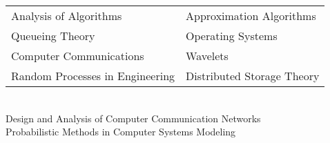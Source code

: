 \documentclass[margin,line]{resume}
\begin{document}
\begin{resume}

\begin{tabular}{@{}p{7cm}p{7cm}}
Analysis of Algorithms       &  Approximation Algorithms                   \\
Queueing Theory  & Operating Systems \\
Computer Communications & Wavelets \\
Random Processes in Engineering  & Distributed Storage Theory
\end{tabular} \\
Design and Analysis of Computer Communication Networks \\
Probabilistic Methods in Computer Systems Modeling    \\





    

\end{resume}
\end{document}
